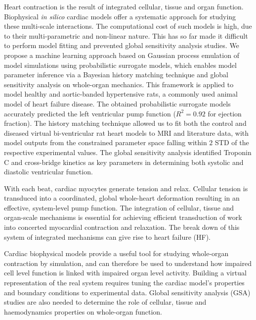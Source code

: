 \noindent
Heart contraction is the result of integrated cellular, tissue and organ function. Biophysical \textit{in silico} cardiac models offer a systematic approach for studying these multi-scale interactions. The computational cost of such models is high, due to their multi-parametric and non-linear nature. This has so far made it difficult to perform model fitting and prevented global sensitivity analysis studies. We propose a machine learning approach based on Gaussian process emulation of model simulations using probabilistic surrogate models, which enables model parameter inference via a Bayesian history matching technique and global sensitivity analysis on whole-organ mechanics. This framework is applied to model healthy and aortic-banded hypertensive rats, a commonly used animal model of heart failure disease. The obtained probabilistic surrogate models accurately predicted the left ventricular pump function ($R^2=0.92$ for ejection fraction). The history matching technique allowed us to fit both the control and diseased virtual bi-ventricular rat heart models to MRI and literature data, with model outputs from the constrained parameter space falling within $2$ STD of the respective experimental values. The global sensitivity analysis identified Troponin C and cross-bridge kinetics as key parameters in determining both systolic and diastolic ventricular function.

\vspace{0.2cm}\noindent
{}

\noindent
With each beat, cardiac myocytes generate tension and relax. Cellular tension is transduced into a coordinated, global whole-heart deformation resulting in an effective, system-level pump function. The integration of cellular, tissue and organ-scale mechanisms is essential for achieving efficient transduction of work into concerted myocardial contraction and relaxation. The break down of this system of integrated mechanisms can give rise to heart failure (HF). 

Cardiac biophysical models provide a useful tool for studying whole-organ contraction \cite{Niederer:2019} by simulation, and can therefore be used to understand how impaired cell level function is linked with impaired organ level activity. Building a virtual representation of the real system requires tuning the cardiac model's properties and boundary conditions to experimental data. Global sensitivity analysis (GSA) studies are also needed to determine the role of cellular, tissue and haemodynamics properties on whole-organ function.

